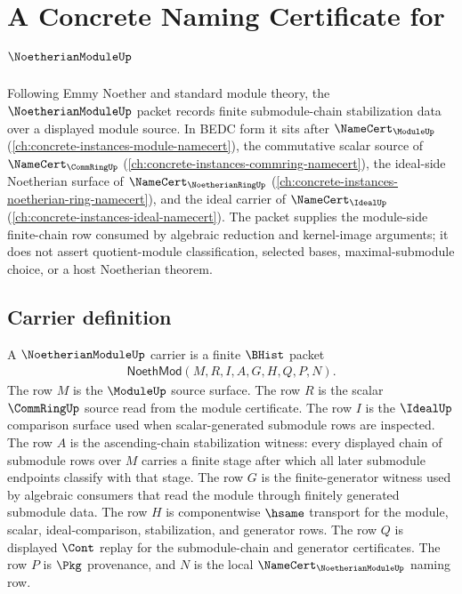 \chapter{A Concrete Naming Certificate for $\NoetherianModuleUp$}
\label{ch:concrete-instances-noetherian-module-namecert}

Following Emmy Noether and standard module theory, the $\NoetherianModuleUp$ packet records finite submodule-chain stabilization data over a displayed module source. In BEDC form it sits after $\NameCert_{\ModuleUp}$ (\autoref{ch:concrete-instances-module-namecert}), the commutative scalar source of $\NameCert_{\CommRingUp}$ (\autoref{ch:concrete-instances-commring-namecert}), the ideal-side Noetherian surface of $\NameCert_{\NoetherianRingUp}$ (\autoref{ch:concrete-instances-noetherian-ring-namecert}), and the ideal carrier of $\NameCert_{\IdealUp}$ (\autoref{ch:concrete-instances-ideal-namecert}). The packet supplies the module-side finite-chain row consumed by algebraic reduction and kernel-image arguments; it does not assert quotient-module classification, selected bases, maximal-submodule choice, or a host Noetherian theorem.

\section{Carrier definition}
\label{sec:noetherian-module-carrier}

\begin{definition}\label{def:noetherian-module-carrier}
A $\NoetherianModuleUp$ carrier is a finite $\BHist$ packet
$$
\begin{gathered}
\mathsf{NoethMod}(M,R,I,A,G,H,Q,P,N).
\end{gathered}
$$
The row $M$ is the $\ModuleUp$ source surface. The row $R$ is the scalar $\CommRingUp$ source read from the module certificate. The row $I$ is the $\IdealUp$ comparison surface used when scalar-generated submodule rows are inspected. The row $A$ is the ascending-chain stabilization witness: every displayed chain of submodule rows over $M$ carries a finite stage after which all later submodule endpoints classify with that stage. The row $G$ is the finite-generator witness used by algebraic consumers that read the module through finitely generated submodule data. The row $H$ is componentwise $\hsame$ transport for the module, scalar, ideal-comparison, stabilization, and generator rows. The row $Q$ is displayed $\Cont$ replay for the submodule-chain and generator certificates. The row $P$ is $\Pkg$ provenance, and $N$ is the local $\NameCert_{\NoetherianModuleUp}$ naming row.
\end{definition}

